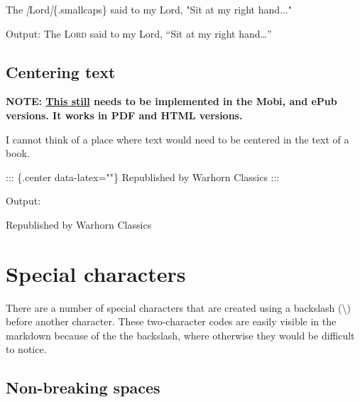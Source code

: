 \documentclass[
]{book}
\newenvironment{Shaded}{\begin{snugshade}}{\end{snugshade}}
\newcommand{\CommentTok}[1]{\textcolor[rgb]{0.56,0.35,0.01}{\textit{#1}}}
\newcommand{\NormalTok}[1]{#1}
\newcommand{\OtherTok}[1]{\textcolor[rgb]{0.56,0.35,0.01}{#1}}
\begin{document}
\begin{Shaded}
\begin{Highlighting}[]
\NormalTok{The }\CommentTok{[}\OtherTok{Lord}\CommentTok{]}\NormalTok{\{.smallcaps\} said to my Lord, "Sit at my right hand..."}
\end{Highlighting}
\end{Shaded}

Output: The \textsc{Lord} said to my Lord, ``Sit at my right hand\ldots{}''

\hypertarget{centering-text}{%
\section{Centering text}\label{centering-text}}

\textbf{NOTE: \href{https://github.com/warhornmedia/classics-documentation/issues/7}{This still} needs to be implemented in the Mobi, and ePub versions. It works in PDF and HTML versions.}

I cannot think of a place where text would need to be centered in the text of a book.

\begin{Shaded}
\begin{Highlighting}[]
\NormalTok{::: \{.center data{-}latex=""\}}
\NormalTok{Republished by Warhorn Classics}
\NormalTok{:::}
\end{Highlighting}
\end{Shaded}

Output:

\begin{center}
Republished by Warhorn Classics

\end{center}

\hypertarget{special-characters}{%
\chapter{Special characters}\label{special-characters}}

There are a number of special characters that are created using a backslash (\textbackslash) before another character. These two-character codes are easily visible in the markdown because of the the backslash, where otherwise they would be difficult to notice.

\hypertarget{non-breaking-spaces}{%
\section{Non-breaking spaces}\label{non-breaking-spaces}}
\end{document}
